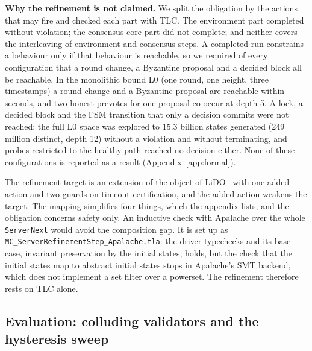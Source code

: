\textbf{Why the refinement is not claimed.} We split the obligation by the actions
that may fire and checked each part with TLC. The environment part completed without
violation; the consensus-core part did not complete; and neither covers the
interleaving of environment and consensus steps. A completed run constrains a
behaviour only if that behaviour is reachable, so we required of every
configuration that a round change, a Byzantine proposal and a decided block all be
reachable. In the monolithic bound L0 (one round, one height, three timestamps) a
round change and a Byzantine proposal are reachable within seconds, and two honest
prevotes for one proposal co-occur at depth 5. A lock, a decided block and the FSM
transition that only a decision commits were not reached: the full L0 space was
explored to 15.3 billion states generated (249 million distinct, depth 12) without
a violation and without terminating, and probes restricted to the healthy path
reached no decision either. None of these configurations is reported as a result
(Appendix~\ref{app:formal}).

The refinement target is an extension of the object of LiDO~\cite{qiu2024lido} with
one added action and two guards on timeout certification, and the added action
weakens the target. The mapping simplifies four things, which the appendix lists, and
the obligation concerns safety only. An inductive check with Apalache over the whole
\texttt{ServerNext} would avoid the composition gap. It is set up as
\texttt{MC\_ServerRefinementStep\_Apalache.tla}: the driver typechecks and its base
case, invariant preservation by the initial states, holds, but the check that the
initial states map to abstract initial states stops in Apalache's SMT backend, which
does not implement a set filter over a powerset. The refinement therefore rests on
TLC alone.


\subsection*{Evaluation: colluding validators and the hysteresis sweep}

